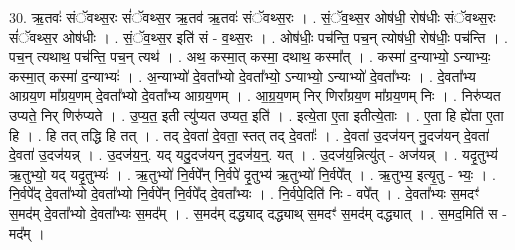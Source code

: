 \documentclass[17pt]{extarticle}
\begin{document}
30. ऋ॒तवः॑ संॅवथ्स॒रः सं॑ॅवथ्स॒र ऋ॒तव॑ ऋ॒तवः॑ संॅवथ्स॒रः । . सं॒ॅव॒थ्स॒र ओष॑धी॒ रोष॑धीः संॅवथ्स॒रः सं॑ॅवथ्स॒र ओष॑धीः । . सं॒ॅव॒थ्स॒र इति॑ सं - व॒थ्स॒रः । . ओष॑धीः॒ पच॑न्ति॒ पच॒न् त्योष॑धी॒ रोष॑धीः॒ पच॑न्ति । . पच॒न् त्यथाथ॒ पच॑न्ति॒ पच॒न् त्यथ॑ । . अथ॒ कस्मा॒त् कस्मा॒ दथाथ॒ कस्मा᳚त् । . कस्मा॑ द॒न्याभ्यो॒ ऽन्याभ्यः॒ कस्मा॒त् कस्मा॑ द॒न्याभ्यः॑ । . अ॒न्याभ्यो॑ दे॒वता᳚भ्यो दे॒वता᳚भ्यो॒ ऽन्याभ्यो॒ ऽन्याभ्यो॑ दे॒वता᳚भ्यः । . दे॒वता᳚भ्य आग्रय॒ण मा᳚ग्रय॒णम् दे॒वता᳚भ्यो दे॒वता᳚भ्य आग्रय॒णम् । . आ॒ग्र॒य॒णम् निर् णिरा᳚ग्रय॒ण मा᳚ग्रय॒णम् निः । . निरु॑प्यत उप्यते॒ निर् णिरु॑प्यते । . उ॒प्य॒त॒ इती त्यु॑प्यत उप्यत॒ इति॑ । . इत्ये॒ता ए॒ता इतीत्ये॒ताः । . ए॒ता हि ह्ये॑ता ए॒ता हि । . हि तत् तद्धि हि तत् । . तद् दे॒वता॑ दे॒वता॒ स्तत् तद् दे॒वताः᳚ । . दे॒वता॑ उ॒दज॑यन् नु॒दज॑यन् दे॒वता॑ दे॒वता॑ उ॒दज॑यन्न् । . उ॒दज॑य॒न्॒. यद् यदु॒दज॑यन् नु॒दज॑य॒न्॒. यत् । . उ॒दज॑य॒न्नित्यु॑त् - अज॑यन्न् । . यदृ॒तुभ्य॑ ऋ॒तुभ्यो॒ यद् यदृ॒तुभ्यः॑ । . ऋ॒तुभ्यो॑ नि॒र्वपे᳚न् नि॒र्वपे॑ दृ॒तुभ्य॑ ऋ॒तुभ्यो॑ नि॒र्वपे᳚त् । . ऋ॒तुभ्य॒ इत्यृ॒तु - भ्यः॒ । . नि॒र्वपे᳚द् दे॒वता᳚भ्यो दे॒वता᳚भ्यो नि॒र्वपे᳚न् नि॒र्वपे᳚द् दे॒वता᳚भ्यः । . नि॒र्वपे॒दिति॑ निः - वपे᳚त् । . दे॒वता᳚भ्यः स॒मदꣳ॑ स॒मद॑म् दे॒वता᳚भ्यो दे॒वता᳚भ्यः स॒मद᳚म् । . स॒मद॑म् दद्ध्याद् दद्ध्याथ् स॒मदꣳ॑ स॒मद॑म् दद्ध्यात् । . स॒मद॒मिति॑ स - मद᳚म् । \newline
\end{document}
